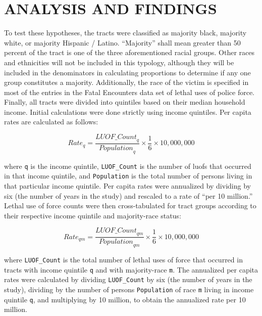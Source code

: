 \documentclass[12pt]{article}
\begin{document}
\section{ANALYSIS AND FINDINGS}

To test these hypotheses, the tracts were classified as majority black, majority white, or majority Hispanic / Latino. “Majority” shall mean greater than 50 percent of the tract is one of the three aforementioned racial groups. Other races and ethnicities will not be included in this typology, although they will be included in the denominators in calculating proportions to determine if any one group constitutes a majority. Additionally, the race of the victim is specified in most of the entries in the Fatal Encounters data set of lethal uses of police force. Finally, all tracts were divided into quintiles based on their median household income. Initial calculations were done strictly using income quintiles. Per capita rates are calculated as follows:

\begin{equation}
{Rate}_q=\frac{{LUOF\_Count}_q}{{Population}_q}\times\frac{1}{6}\times10,000,000
\label{eq:quintile_rate}
\end{equation}

\noindent{}where \texttt{q} is the income quintile, \texttt{LUOF\_Count} is the number of \acrshort{luof}s that occurred in that income quintile, and \texttt{Population} is the total number of persons living in that particular income quintile. Per capita rates were annualized by dividing by six (the number of years in the study) and rescaled to a rate of “per 10 million.” Lethal use of force counts were then cross-tabulated for tract groups according to their respective income quintile and majority-race status:

\begin{equation}
{Rate}_{qm}=\frac{{LUOF\_Count}_{qm}}{{Population}_{qm}}\times\frac{1}{6}\times10,000,000
\label{eq:quintile_majority_rate}
\end{equation}

\noindent{}where \texttt{LUOF\_Count} is the total number of lethal uses of force that occurred in tracts with income quintile \texttt{q} and with majority-race \texttt{m}. The annualized per capita rates were calculated by dividing \texttt{LUOF\_Count} by six (the number of years in the study), dividing by the number of persons \texttt{Population} of race \texttt{m} living in income quintile \texttt{q}, and multiplying by 10 million, to obtain the annualized rate per 10 million.
\end{document}
